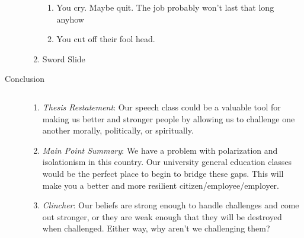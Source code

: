 \documentclass[letterpaper]{article}
\begin{document}
\begin{description}
\begin{enumerate}
\begin{enumerate}
    \item
      You cry. Maybe quit. The job probably won't last that long anyhow \cite{forbes}
    \item
      You cut off their fool head.
  \end{enumerate}
  \renewcommand{\labelenumi}{\emph{Transition}:}
  \item
  Sword Slide
  \renewcommand{\labelenumi}{\Roman{enumi}}
\end{enumerate}
\item[Conclusion]$\quad$
\begin{enumerate}
  \item
  \emph{Thesis Restatement}:
  Our speech class could be a valuable tool for making us better and stronger people by allowing us to challenge one another morally, politically, or spiritually.
  \item
  \emph{Main Point Summary}:
  We have a problem with polarization and isolationism in this country. Our university general education classes would be the perfect place to begin to bridge these gaps. This will make you a better and more resilient citizen/employee/employer.
  \item
  \emph{Clincher}:
  Our beliefs are strong enough to handle challenges and come out stronger, or they are weak enough that they will be destroyed when challenged. Either way, why aren't we challenging them?
\end{enumerate}
\end{description}


\newpage


\end{document}
